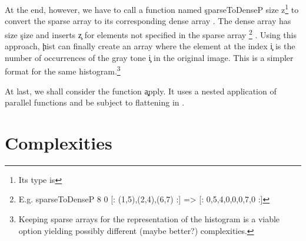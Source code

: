   At the end, however, we have to call a function
  named \c{sparseToDenseP size z}\footnote{Its type is  }
  to convert the sparse array  to its corresponding
  dense array \type{[:Int:]}. The dense array has size \c{size} and
  inserts \c{z} for elements not specified in the sparse array
  \footnote{E.g. \c{ sparseToDenseP 8 0 [: (1,5),(2,4),(6,7) :] => [: 0,5,4,0,0,0,7,0 :]}}
  .
  Using this approach, \c{hist} can finally create an array where
  the element at the index \c{i} is the number of occurrences
  of the gray tone \c{i} in the original image. This is
  a simpler format for the same histogram.\footnote{Keeping sparse arrays for the representation of the histogram is a viable option yielding possibly different (maybe better?) complexities.}
  
  At last, we shall consider the function \c{apply}. It uses a nested
  application of parallel functions and be subject to flattening in \ndpv.
  
\section{Complexities}
  
  
      
    
  
